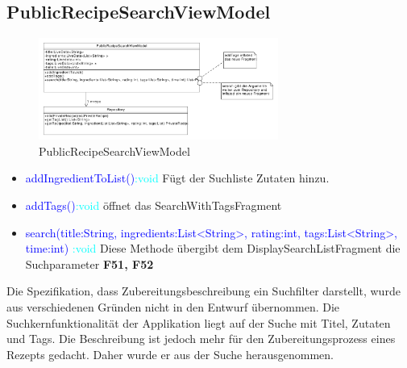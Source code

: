 \subsection{PublicRecipeSearchViewModel}
\begin{figure}[H]
	\centering
	\includegraphics[width=0.7\textwidth]{pics/viewModel/Public_Recipe_Search_VieModel.pdf}%
	\caption{PublicRecipeSearchViewModel}%
	\label{viewModel}%
\end{figure}
\begin{itemize}
	\item  \textcolor{blue}{addIngredientToList()}\textcolor{cyan}{:void}
	Fügt der Suchliste Zutaten hinzu.
	\item  \textcolor{blue}{addTags()}\textcolor{cyan}{:void} öffnet das SearchWithTagsFragment
	\item \textcolor{blue}{search(title:String, ingredients:List<String>, rating:int, tags:List<String>, time:int)} \textcolor{cyan}{:void} Diese Methode übergibt dem DisplaySearchListFragment die Suchparameter \textbf{F51, F52}
	
\end{itemize}
Die Spezifikation, dass Zubereitungsbeschreibung ein Suchfilter darstellt, wurde aus verschiedenen Gründen nicht in den Entwurf übernommen. Die Suchkernfunktionalität der Applikation liegt auf der Suche mit Titel, Zutaten und Tags. Die Beschreibung ist jedoch mehr für den Zubereitungsprozess eines Rezepts gedacht. Daher wurde er aus der Suche herausgenommen.


